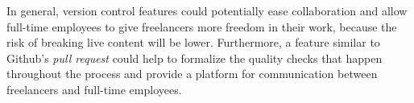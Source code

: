 
In general, version control features could potentially ease collaboration and allow full-time employees to give freelancers more freedom in their work, because the risk of breaking live content will be lower. Furthermore, a feature similar to Github's \textit{pull request} could help to formalize the quality checks that happen throughout the process and provide a platform for communication between freelancers and full-time employees.
